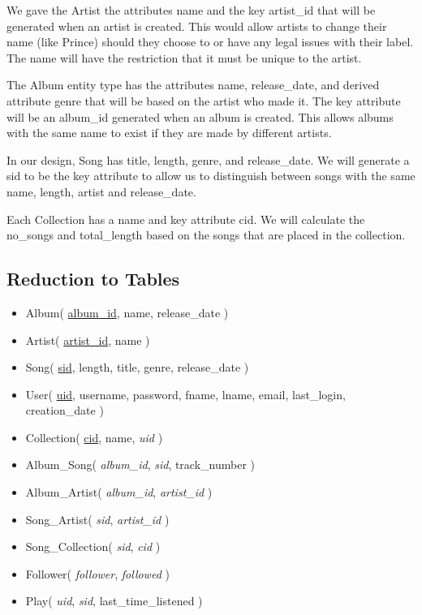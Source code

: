 \documentclass[12pt]{article}
\begin{document}
    \vspace{0.5cm}

    \noindent We gave the Artist the attributes name and the key artist\_id that
    will be generated when an artist is created. This would allow artists to change their
    name (like Prince) should they choose to or have any legal issues with their label. The
    name will have the restriction that it must be unique to the artist.

    \vspace{0.5cm}

    \noindent The Album entity type has the attributes name, release\_date, and derived attribute
    genre that will be based on the artist who made it. The key
    attribute will be an album\_id generated when an album is created. This allows albums
    with the same name to exist if they are made by different artists.

    \vspace{0.5cm}

    \noindent In our design, Song has title, length, genre, and release\_date. We will
    generate a sid to be the key attribute to allow us to distinguish between songs with
    the same name, length, artist and release\_date.

    \vspace{0.5cm}

    \noindent Each Collection has a name and key attribute cid. We will calculate
    the no\_songs and total\_length based on the songs that are placed in the collection.

    \subsection{Reduction to Tables}

    \begin{itemize}
        \item Album( \underline{album\_id}, name, release\_date )
        \item Artist( \underline{artist\_id}, name )
        \item Song( \underline{sid}, length, title, genre, release\_date )
        \item User( \underline{uid}, username, password, fname, lname, email, last\_login, creation\_date )
        \item Collection( \underline{cid}, name, \emph{uid} )
        \item Album\_Song( \emph{album\_id}, \emph{sid}, track\_number )
        \item Album\_Artist( \emph{album\_id}, \emph{artist\_id} )
        \item Song\_Artist( \emph{sid}, \emph{artist\_id} )
        \item Song\_Collection( \emph{sid}, \emph{cid} )
        \item Follower( \emph{follower}, \emph{followed} )
        \item Play( \emph{uid}, \emph{sid}, last\_time\_listened )
    \end{itemize}
\end{document}
